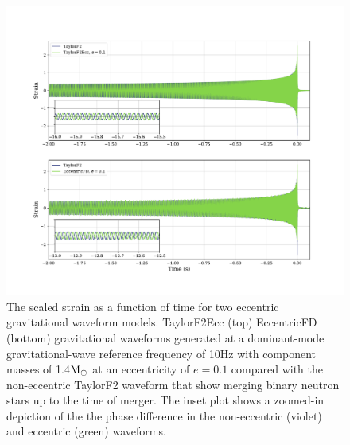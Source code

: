 \begin{figure}
    \centering
    \includegraphics[width=1.0\textwidth,keepaspectratio]{Figures/Methods/Waveformplot.pdf}
    \caption{The scaled strain as a function of time for two eccentric gravitational waveform models. TaylorF2Ecc (top) EccentricFD (bottom) gravitational waveforms generated at a dominant-mode gravitational-wave reference frequency of 10Hz with component masses of 1.4$\mathrm{M}_{\odot}$ at an eccentricity of $e=0.1$ compared with the non-eccentric TaylorF2 waveform that show merging binary neutron stars up to the time of merger. The inset plot shows a zoomed-in depiction of the the phase difference in the non-eccentric (violet) and eccentric (green) waveforms.}
    \label{fig:waveforms}
\end{figure}